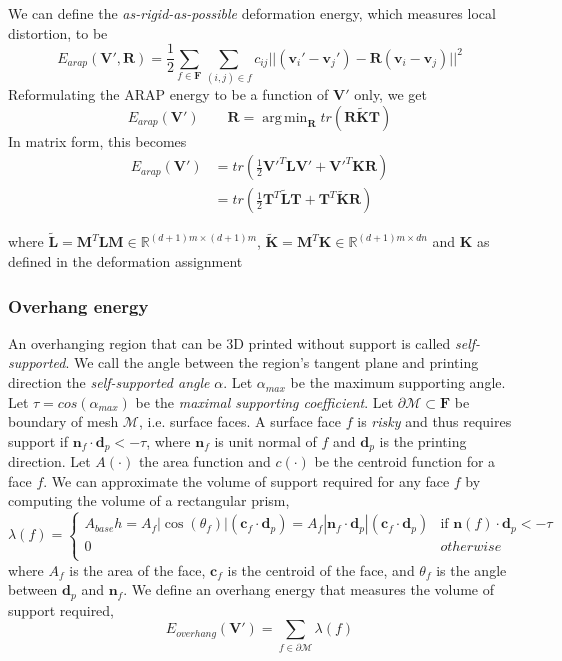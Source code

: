 \documentclass[10pt]{article}
\newcommand{\R}{\mathbb{R}}
\newcommand{\calM}{\mathcal{M}}
\newcommand{\bL}{\mathbf{L}}
\newcommand{\bV}{\mathbf{V}}
\newcommand{\bF}{\mathbf{F}}
\newcommand{\bR}{\mathbf{R}}
\newcommand{\bM}{\mathbf{M}}
\newcommand{\bT}{\mathbf{T}}
\newcommand{\bv}{\mathbf{v}}
\newcommand{\bK}{\mathbf{K}}
\newcommand{\bn}{\mathbf{n}}
\newcommand{\bd}{\mathbf{d}}
\newcommand{\bc}{\mathbf{c}}
\DeclareMathOperator*{\argmin}{arg\,min} %
\begin{document}
We can define the \textit{as-rigid-as-possible} deformation energy, which measures local distortion, to be
\[
    E_{arap}(\bV', \bR) = \frac{1}{2} \sum_{f\in \bF} \sum_{(i,j)\in f} c_{ij} || (\bv_i' - \bv_j') - \bR(\bv_i - \bv_j) ||^2
\]
Reformulating the ARAP energy to be a function of $\bV'$ only, we get
\[
    E_{arap}(\bV')
    \qquad
    \bR = \argmin_{\bR} tr(\bR\tilde{\bK}\bT)
\]
In matrix form, this becomes
\begin{align*}
E_{arap}(\bV') 
    &= tr(\frac{1}{2}\bV'^T \bL \bV' + \bV'^T \bK \bR ) \\
    &= tr(\frac{1}{2}\bT^T \tilde{\bL} \bT + \bT^T \tilde{\bK} \bR)
\end{align*}
    
where $\tilde{\bL} = \bM^T \bL \bM \in \R^{(d+1)m \times (d+1)m}$, $\tilde{\bK} = \bM^T \bK \in \R^{(d+1)m \times dn}$ and $\bK$ as defined in the deformation assignment

\subsubsection*{Overhang energy}

An overhanging region that can be 3D printed without support is called \textit{self-supported}. We call the angle between the region's tangent plane and printing direction the \textit{self-supported angle} $\alpha$. Let $\alpha_{max}$ be the maximum supporting angle. Let $\tau = cos(\alpha_{max})$ be the \textit{maximal supporting coefficient}. Let $\partial \calM \subset \bF$ be boundary of mesh $\calM$, i.e. surface faces. A surface face $f$ is \textit{risky} and thus requires support if $\bn_f \cdot \bd_{p} < -\tau$, where $\bn_f$ is unit normal of $f$ and $\bd_{p}$ is the printing direction. Let $A(\cdot)$ the area function and $c(\cdot)$ be the centroid function for a face $f$. We can approximate the volume of support required for any face $f$ by computing the volume of a rectangular prism,
\[
    \lambda(f) = 
    \begin{cases}
        A_{base} h = A_f |\cos(\theta_f)| (\bc_f \cdot \bd_{p}) = A_f |\bn_f \cdot \bd_{p}| (\bc_f \cdot \bd_{p}) & \text{if } \bn(f) \cdot \bd_{p} < -\tau \\
        0 & otherwise \\
    \end{cases}
\]
where $A_f$ is the area of the face, $\bc_f$ is the centroid of the face, and $\theta_f$ is the angle between $\bd_{p}$ and $\bn_f$. We define an overhang energy that measures the volume of support required,
\[
    E_{overhang}(\bV') = \sum_{f\in \partial \calM} \lambda(f)
\]
\end{document}
